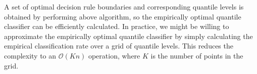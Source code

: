 




A set of optimal decision rule boundaries and corresponding quantile levels is
obtained by performing above algorithm, so the empirically optimal quantile
classifier can be efficiently calculated.  In practice, we might be willing to
approximate the empirically optimal quantile classifier by simply calculating
the empirical classification rate over a grid of quantile levels.  This reduces
the complexity to an $\mathcal{O}(Kn)$ operation, where $K$ is the number of
points in the grid.



